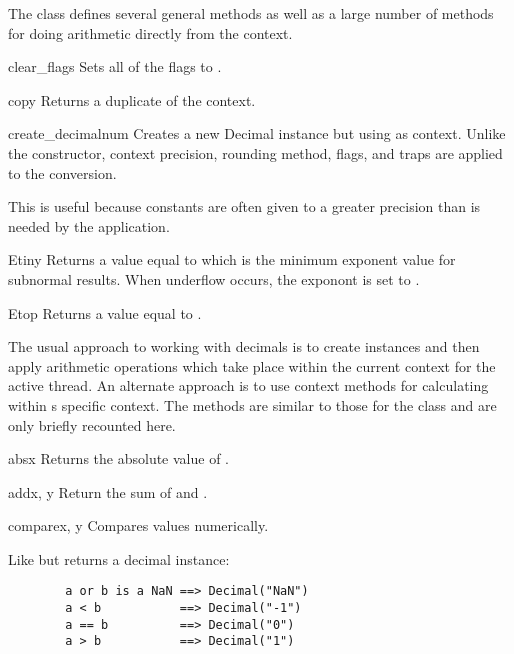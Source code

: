 The  class defines several general methods as well as a
large number of methods for doing arithmetic directly from the context.

\begin{methoddesc}{clear_flags}{}
  Sets all of the flags to .
\end{methoddesc}  

\begin{methoddesc}{copy}{}
  Returns a duplicate of the context.
\end{methoddesc}  

\begin{methoddesc}{create_decimal}{num}
  Creates a new Decimal instance but using  as context.
  Unlike the  constructor, context precision,
  rounding method, flags, and traps are applied to the conversion.

  This is useful because constants are often given to a greater
  precision than is needed by the application.
\end{methoddesc} 

\begin{methoddesc}{Etiny}{}
  Returns a value equal to  which is the minimum
  exponent value for subnormal results.  When underflow occurs, the
  exponont is set to .
\end{methoddesc} 

\begin{methoddesc}{Etop}{}
  Returns a value equal to .
\end{methoddesc} 


The usual approach to working with decimals is to create 
instances and then apply arithmetic operations which take place within the
current context for the active thread.  An alternate approach is to use
context methods for calculating within s specific context.  The methods are
similar to those for the  class and are only briefly recounted
here.

\begin{methoddesc}{abs}{x}
  Returns the absolute value of .
\end{methoddesc}

\begin{methoddesc}{add}{x, y}
  Return the sum of  and .
\end{methoddesc}
   
\begin{methoddesc}{compare}{x, y}
  Compares values numerically.
  
  Like  but returns a decimal instance:
  \begin{verbatim}
        a or b is a NaN ==> Decimal("NaN")
        a < b           ==> Decimal("-1")
        a == b          ==> Decimal("0")
        a > b           ==> Decimal("1")
  \end{verbatim}                                          
\end{methoddesc}

